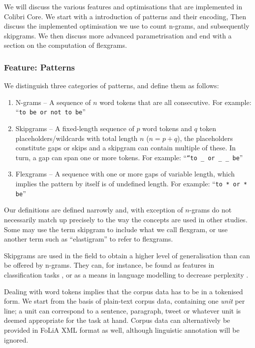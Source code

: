 \documentclass[a4paper,12pt]{article}
\begin{document}
We will discuss the various features and optimisations that are implemented in Colibri Core. We start with a introduction of patterns and their encoding,
Then discuss the implemented optimisation we use to count n-grams, and subsequently skipgrams. We then discuss more advanced parametrisation and end with a section on the computation of flexgrams.

\subsubsection{Feature: Patterns}
\label{sec:patterns}

We distinguish three categories of patterns, and define them as follows:

\begin{enumerate}
    \item N-grams -- A sequence of $n$ word tokens that are all consecutive.
        For example: ``\texttt{to be or not to be}''
    \item Skipgrams -- A fixed-length sequence of $p$ word tokens and $q$ token
        placeholders/wildcards with total length $n$ ($n=p+q$), the
        placeholders constitute gaps or skips and a skipgram can contain
        multiple of these. In turn, a gap can span one or more tokens. For
    example: ``\texttt{``to \_ or \_ \_ be}''
    \item Flexgrams -- A sequence with one or more gaps of variable length,
        which implies the pattern by itself is of undefined length. For example:
        ``\texttt{to * or * be}''
\end{enumerate}

Our definitions are defined narrowly and, with exception of $n$-grams do not
necessarily match up precisely to the way the concepts are used in other studies. Some
may use the term skipgram to include what we call flexgram, or use another term
such as ``elastigram'' to refer to flexgrams. 

Skipgrams are used in the field to obtain a higher level of generalisation than
can be offered by n-grams. They can, for instance, be found as features in
classification tasks \cite{DHONDT}, or as a means in language modelling to
decrease perplexity \cite{Guthrie06}.

Dealing with word tokens implies that the corpus data has to be in a
tokenised form. We start from the basis of plain-text corpus data, containing one
\emph{unit} per line; a unit can correspond to a sentence, paragraph, tweet
or whatever unit is deemed appropriate for the task at hand. Corpus data can
alternatively be provided in FoLiA XML format \cite{FOLIAPAPER} as well, although linguistic
annotation will be ignored.
\end{document}
